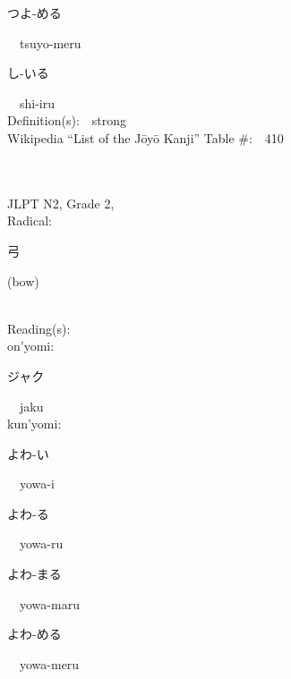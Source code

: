 \begin{multicols}{2}
{\hspace*{2em}}{\begin{CJK}{UTF8}{min} つよ-める \end{CJK}}\ \ tsuyo-meru\ \ \\
{\hspace*{2em}}{\begin{CJK}{UTF8}{min} し-いる \end{CJK}}\ \ shi-iru\ \ \\
Definition(s):\ \ strong \\
Wikipedia ``List of the J\=oy\=o Kanji'' Table \#:\ \ 410 \\
\ \ \\
{\fontsize{34pt}{40pt}  }\ \ \\  %
{JLPT N2, Grade 2, \\Radical:\ \ {\begin{CJK}{UTF8}{min} 弓 \end{CJK}} (bow) } \\
Reading(s):\ \ \\
{\hspace*{1em}}on'yomi:\ \ \\
{\hspace*{2em}}{\begin{CJK}{UTF8}{min} ジャク \end{CJK}}\ \ jaku\ \ \\
{\hspace*{1em}}kun'yomi:\ \ \\
{\hspace*{2em}}{\begin{CJK}{UTF8}{min} よわ-い \end{CJK}}\ \ yowa-i\ \ \\
{\hspace*{2em}}{\begin{CJK}{UTF8}{min} よわ-る \end{CJK}}\ \ yowa-ru\ \ \\
{\hspace*{2em}}{\begin{CJK}{UTF8}{min} よわ-まる \end{CJK}}\ \ yowa-maru\ \ \\
{\hspace*{2em}}{\begin{CJK}{UTF8}{min} よわ-める \end{CJK}}\ \ yowa-meru\ \ \\

\end{multicols}
